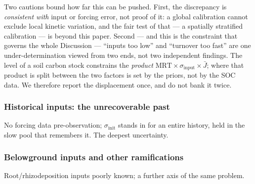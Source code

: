 \documentclass[11pt]{article}
\begin{document}
Two cautions bound how far this can be pushed. First, the discrepancy is
\emph{consistent with} input or forcing error, not proof of it: a global
calibration cannot exclude local kinetic variation, and the fair test of that ---
a spatially stratified calibration --- is beyond this paper. Second --- and this is the
constraint that governs the whole Discussion --- ``inputs too low'' and ``turnover
too fast'' are one under-determination viewed from two ends, not two independent
findings. The level of a soil carbon stock constrains the \emph{product}
$\mathrm{MRT}\times\sigma_{\mathrm{input}}\times\bar J$; where that product is
split between the two factors is set by the priors, not by the SOC data. We
therefore report the displacement once, and do not bank it twice.

\subsubsection{Historical inputs: the unrecoverable past}
No forcing data pre-observation; $\sigma_{\mathrm{init}}$ stands in for an
entire history, held in the slow pool that remembers it. The deepest
uncertainty.

\subsubsection{Belowground inputs and other ramifications}
Root/rhizodeposition inputs poorly known; a further axis of the same problem.

\end{document}
